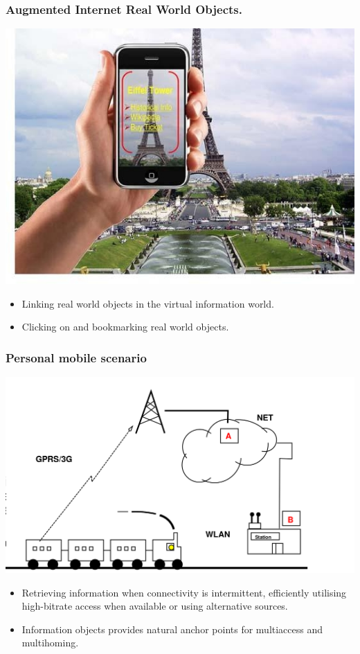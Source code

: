 \documentclass [12pt] {beamer}
\begin{document}
\begin{frame}
  \frametitle{Augmented Internet Real World Objects.}
    \begin{center}
      \includegraphics[keepaspectratio=true,scale=.26]{pic2.jpg}    
    \end{center}

\begin{itemize}
 \item Linking real world objects in the virtual information world.
 \item Clicking on and bookmarking real world objects.
\end{itemize}
\end{frame}


\begin{frame}
  \frametitle{Personal mobile scenario}
  \begin{center}
    \includegraphics[keepaspectratio=true,scale=.13]{netinf7.png}
   
  \end{center}

\begin{itemize}
 \item Retrieving information when connectivity is intermittent, efficiently utilising high-bitrate access when available or using alternative sources.
 \item Information objects provides natural anchor points for multiaccess and multihoming.
\end{itemize}

\end{frame}
\end{document}
